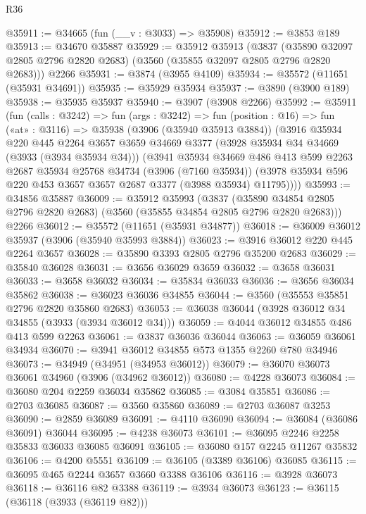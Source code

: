 \begin{lexlean}{R36}
\begin{coremodule}
@35911 := @34665 (fun (__v : @3033) => @35908)
@35912 := @3853 @189
@35913 := @34670 @35887
@35929 := @35912
    @35913
    (@3837 (@35890 @32097 @2805 @2796 @2820 @2683) (@3560 (@35855 @32097 @2805 @2796 @2820 @2683)))
    @2266
@35931 := @3874 (@3955 @4109)
@35934 := @35572 (@11651 (@35931 @34691))
@35935 := @35929 @35934
@35937 := @3890 (@3900 @189)
@35938 := @35935 @35937
@35940 := @3907 (@3908 @2266)
@35992 := @35911
    (fun (calls : @3242) =>
    fun (args : @3242) =>
    fun (position : @16) =>
    fun («at» : @3116) =>
    @35938
      (@3906 (@35940 @35913 @3884))
      (@3916
        @35934
        @220
        @445
        @2264
        @3657
        @3659
        @34669
        @3377
        (@3928 @35934 @34 @34669 (@3933 (@3934 @35934 @34)))
        (@3941
          @35934
          @34669
          @486
          @413
          @599
          @2263
          @2687
          @35934
          @25768
          @34734
          (@3906 (@7160 @35934))
          (@3978 @35934 @596 @220 @453 @3657 @3657 @2687 @3377 (@3988 @35934) @11795))))
@35993 := @34856 @35887
@36009 := @35912
    @35993
    (@3837 (@35890 @34854 @2805 @2796 @2820 @2683) (@3560 (@35855 @34854 @2805 @2796 @2820 @2683)))
    @2266
@36012 := @35572 (@11651 (@35931 @34877))
@36018 := @36009 @36012 @35937 (@3906 (@35940 @35993 @3884))
@36023 := @3916 @36012 @220 @445 @2264 @3657
@36028 := @35890 @3393 @2805 @2796 @35200 @2683
@36029 := @35840 @36028
@36031 := @3656 @36029 @3659
@36032 := @3658 @36031
@36033 := @3658 @36032
@36034 := @35834 @36033
@36036 := @3656 @36034 @35862
@36038 := @36023 @36036 @34855
@36044 := @3560 (@35553 @35851 @2796 @2820 @35860 @2683)
@36053 := @36038 @36044 (@3928 @36012 @34 @34855 (@3933 (@3934 @36012 @34)))
@36059 := @4044 @36012 @34855 @486 @413 @599 @2263
@36061 := @3837 @36036 @36044
@36063 := @36059 @36061 @34934
@36070 := @3941 @36012 @34855 @573 @1355 @2260 @780 @34946
@36073 := @34949 (@34951 (@34953 @36012))
@36079 := @36070 @36073 @36061 @34960 (@3906 (@34962 @36012))
@36080 := @4228 @36073
@36084 := @36080 @204 @2259 @36034 @35862
@36085 := @3084 @35851
@36086 := @2703 @36085
@36087 := @3560 @35860
@36089 := @2703 @36087 @3253
@36090 := @2859 @36089
@36091 := @4110 @36090
@36094 := @36084 (@36086 @36091) @36044
@36095 := @4238 @36073
@36101 := @36095 @2246 @2258 @35833 @36033 @36085 @36091
@36105 := @36080 @157 @2245 @11267 @35832
@36106 := @4200 @5551
@36109 := @36105 (@3389 @36106) @36085
@36115 := @36095 @465 @2244 @3657 @3660 @3388 @36106
@36116 := @3928 @36073
@36118 := @36116 @82 @3388
@36119 := @3934 @36073
@36123 := @36115 (@36118 (@3933 (@36119 @82)))

\end{coremodule}
\end{lexlean}
